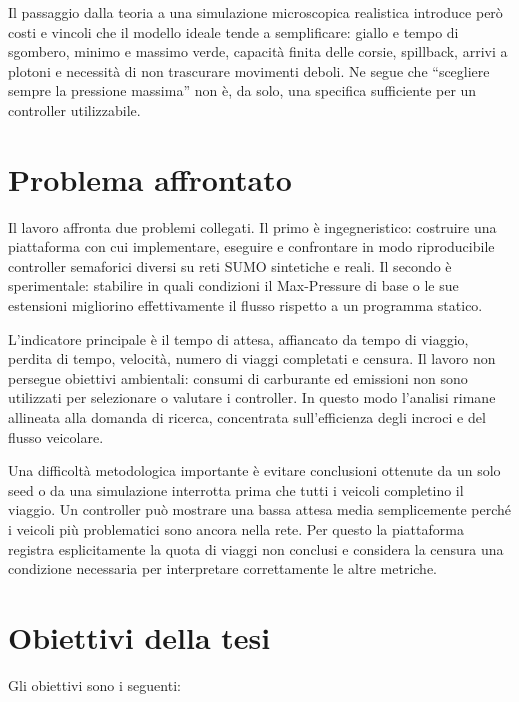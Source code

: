 \documentclass[12pt,a4paper,oneside]{report}
\numberwithin{equation}{chapter}
\begin{document}
Il passaggio dalla teoria a una simulazione microscopica realistica introduce
però costi e vincoli che il modello ideale tende a semplificare: giallo e
tempo di sgombero, minimo e massimo verde, capacità finita delle corsie,
spillback, arrivi a plotoni e necessità di non trascurare movimenti deboli. Ne
segue che ``scegliere sempre la pressione massima'' non è, da solo, una
specifica sufficiente per un controller utilizzabile.

\section{Problema affrontato}

Il lavoro affronta due problemi collegati. Il primo è ingegneristico: costruire
una piattaforma con cui implementare, eseguire e confrontare in modo
riproducibile controller semaforici diversi su reti SUMO sintetiche e reali. Il
secondo è sperimentale: stabilire in quali condizioni il Max-Pressure di base
o le sue estensioni migliorino effettivamente il flusso rispetto a un programma
statico.

L'indicatore principale è il tempo di attesa, affiancato da tempo di viaggio,
perdita di tempo, velocità, numero di viaggi completati e censura. Il lavoro
non persegue obiettivi ambientali: consumi di carburante ed emissioni non sono
utilizzati per selezionare o valutare i controller. In questo modo l'analisi
rimane allineata alla domanda di ricerca, concentrata sull'efficienza degli
incroci e del flusso veicolare.

Una difficoltà metodologica importante è evitare conclusioni ottenute da un
solo seed o da una simulazione interrotta prima che tutti i veicoli completino
il viaggio. Un controller può mostrare una bassa attesa media semplicemente
perché i veicoli più problematici sono ancora nella rete. Per questo la
piattaforma registra esplicitamente la quota di viaggi non conclusi e considera
la censura una condizione necessaria per interpretare correttamente le altre
metriche.

\section{Obiettivi della tesi}

Gli obiettivi sono i seguenti:
\end{document}
